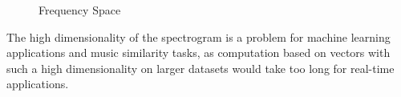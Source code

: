 \begin{figure}[htbp]
	\centering
	\begin{subfigure}{0.5\textwidth}
		\centering
		\label{laylaspec}
	\end{subfigure}%
	\begin{subfigure}{0.5\textwidth}
		\centering
		\label{laylaspecfft}
	\end{subfigure}
	\caption{Frequency Space}
	\label{fig:test}
\end{figure}
\FloatBarrier
\noindent The high dimensionality of the spectrogram is a problem for machine learning applications and music similarity tasks, as computation based on vectors with such a high dimensionality on larger datasets would take too long for real-time applications.
